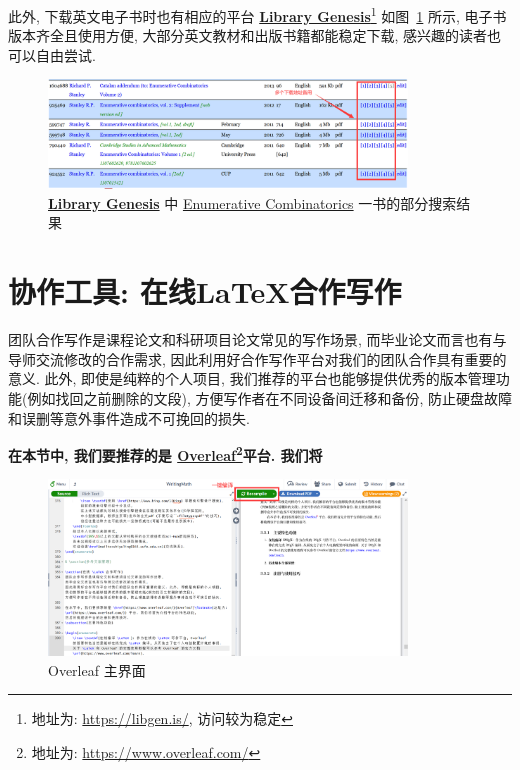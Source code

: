 \documentclass{booki}
\begin{document}
此外, 下载英文电子书时也有相应的平台 \textbf{\href{https://libgen.is/}{Library Genesis}}\footnote{地址为: \url{https://libgen.is/}, 访问较为稳定} 如图~\ref{fig:libgen} 所示, 电子书版本齐全且使用方便, 大部分英文教材和出版书籍都能稳定下载, 感兴趣的读者也可以自由尝试.
\begin{figure}[H]
    \centering
    \includegraphics[width=0.85\textwidth]{figure/ec.png}
    \caption{\textbf{\href{https://libgen.is/}{Library Genesis}} 中 \href{https://libgen.is/search.php?&req=Enumerative+Combinatorics&phrase=1&view=simple&column=def&sort=year&sortmode=DESC}{Enumerative Combinatorics} 一书的部分搜索结果}
    \label{fig:libgen}
\end{figure}

\section{协作工具: 在线\LaTeX 合作写作}
团队合作写作是课程论文和科研项目论文常见的写作场景, 而毕业论文而言也有与导师交流修改的合作需求, 因此利用好合作写作平台对我们的团队合作具有重要的意义. 此外, 即使是纯粹的个人项目, 我们推荐的平台也能够提供优秀的版本管理功能(例如找回之前删除的文段), 方便写作者在不同设备间迁移和备份, 防止硬盘故障和误删等意外事件造成不可挽回的损失.

{\textbf{在本节中, 我们要推荐的是 \href{https://www.overleaf.com/}{Overleaf}\footnote{地址为: \url{https://www.overleaf.com/}}平台. 我们将}
\begin{center}
    \noindent{}
\end{center}}

\begin{figure}[H]
    \centering
    \includegraphics[width=0.85\textwidth]{figure/overleafMain.png}
    \caption{Overleaf 主界面}
    \label{fig:overleafMain}
\end{figure}
\end{document}
